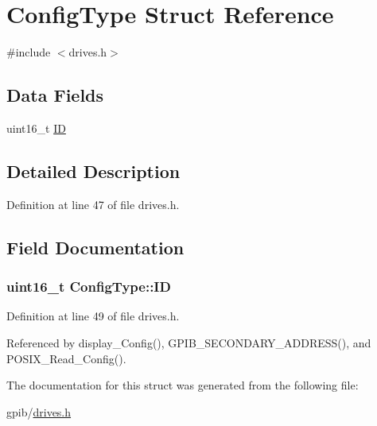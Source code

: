 \hypertarget{structConfigType}{}\section{Config\+Type Struct Reference}
\label{structConfigType}


{\ttfamily \#include $<$drives.\+h$>$}

\subsection*{Data Fields}
\begin{DoxyCompactItemize}
\item 
uint16\+\_\+t \hyperlink{structConfigType_a7d89346361dc0f06db0917c7ff37501a}{ID}
\end{DoxyCompactItemize}


\subsection{Detailed Description}


Definition at line 47 of file drives.\+h.



\subsection{Field Documentation}
\subsubsection[{\texorpdfstring{ID}{ID}}]{\setlength{\rightskip}{0pt plus 5cm}uint16\+\_\+t Config\+Type\+::\+ID}\hypertarget{structConfigType_a7d89346361dc0f06db0917c7ff37501a}{}\label{structConfigType_a7d89346361dc0f06db0917c7ff37501a}


Definition at line 49 of file drives.\+h.



Referenced by display\+\_\+\+Config(), G\+P\+I\+B\+\_\+\+S\+E\+C\+O\+N\+D\+A\+R\+Y\+\_\+\+A\+D\+D\+R\+E\+S\+S(), and P\+O\+S\+I\+X\+\_\+\+Read\+\_\+\+Config().



The documentation for this struct was generated from the following file\+:\begin{DoxyCompactItemize}
\item 
gpib/\hyperlink{drives_8h}{drives.\+h}\end{DoxyCompactItemize}
